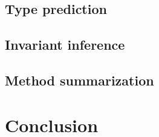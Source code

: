 \documentclass[sigconf,authordraft=true,nonacm=true]{acmart}
\begin{document}
\subsection{Type prediction}

\subsection{Invariant inference}

\subsection{Method summarization}


\section{Conclusion}

\Blindtext



\end{document}
